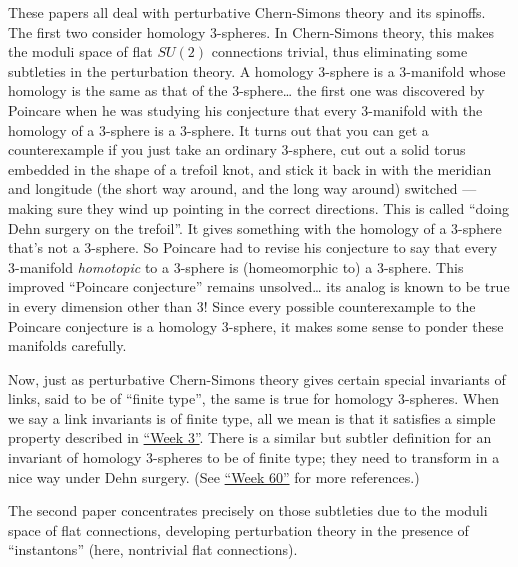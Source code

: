 \documentclass{article}
\renewcommand{\texttt}[1]{%
  \begingroup
  \ttfamily
  \begingroup\lccode`~=`/\lowercase{\endgroup\def~}{/\discretionary{}{}{}}%
  \begingroup\lccode`~=`[\lowercase{\endgroup\def~}{[\discretionary{}{}{}}%
  \begingroup\lccode`~=`.\lowercase{\endgroup\def~}{.\discretionary{}{}{}}%
  \catcode`/=\active\catcode`[=\active\catcode`.=\active
  \scantokens{#1\noexpand}%
  \endgroup
}
\begin{document}
These papers all deal with perturbative Chern-Simons theory and its
spinoffs. The first two consider homology 3-spheres. In Chern-Simons
theory, this makes the moduli space of flat \(SU(2)\) connections
trivial, thus eliminating some subtleties in the perturbation theory. A
homology 3-sphere is a 3-manifold whose homology is the same as that of
the 3-sphere\ldots{} the first one was discovered by Poincare when he
was studying his conjecture that every 3-manifold with the homology of a
3-sphere is a 3-sphere. It turns out that you can get a counterexample
if you just take an ordinary 3-sphere, cut out a solid torus embedded in
the shape of a trefoil knot, and stick it back in with the meridian and
longitude (the short way around, and the long way around) switched ---
making sure they wind up pointing in the correct directions. This is
called ``doing Dehn surgery on the trefoil''. It gives something with
the homology of a 3-sphere that's not a 3-sphere. So Poincare had to
revise his conjecture to say that every 3-manifold \emph{homotopic} to a
3-sphere is (homeomorphic to) a 3-sphere. This improved ``Poincare
conjecture'' remains unsolved\ldots{} its analog is known to be true in
every dimension other than 3! Since every possible counterexample to the
Poincare conjecture is a homology 3-sphere, it makes some sense to
ponder these manifolds carefully.

Now, just as perturbative Chern-Simons theory gives certain special
invariants of links, said to be of ``finite type'', the same is true for
homology 3-spheres. When we say a link invariants is of finite type, all
we mean is that it satisfies a simple property described in
\protect\hyperlink{week3}{``Week 3''}. There is a similar but subtler
definition for an invariant of homology 3-spheres to be of finite type;
they need to transform in a nice way under Dehn surgery. (See
\protect\hyperlink{week60}{``Week 60''} for more references.)

The second paper concentrates precisely on those subtleties due to the
moduli space of flat connections, developing perturbation theory in the
presence of ``instantons'' (here, nontrivial flat connections).

\end{document}
